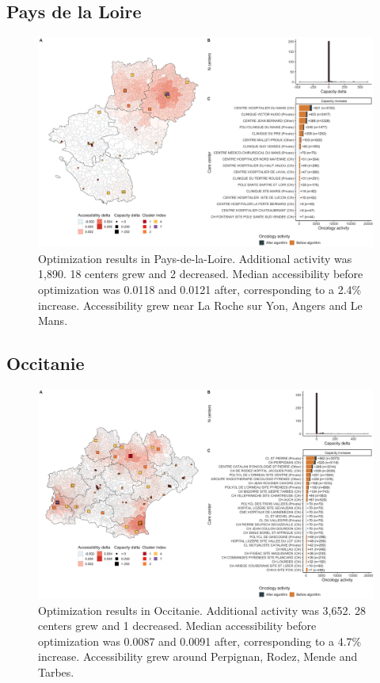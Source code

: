 \subsection*{Pays de la Loire}

\begin{figure}[h]
    \includegraphics[width=\textwidth]{images/camion/optim_region/optim_Pays-de-la-Loire.png}
    \centering
    \caption{
        Optimization results in Pays-de-la-Loire. Additional activity was 1,890. 18 centers grew and 2 decreased. Median accessibility before optimization was 0.0118 and 0.0121 after, corresponding to a 2.4\% increase. Accessibility grew near La Roche sur Yon, Angers and Le Mans.
    }
\end{figure}

\subsection*{Occitanie}

\begin{figure}[h]
    \includegraphics[width=\textwidth]{images/camion/optim_region/optim_Occitanie.png}
    \centering
    \caption{
        Optimization results in Occitanie. Additional activity was 3,652. 28 centers grew and 1 decreased. Median accessibility before optimization was 0.0087 and 0.0091 after, corresponding to a 4.7\% increase. Accessibility grew around Perpignan, Rodez, Mende and Tarbes.
    }
\end{figure}

